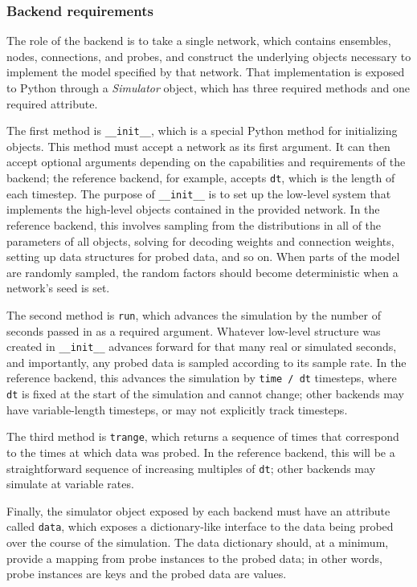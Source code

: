 \documentclass{frontiersSCNS}
\begin{document}
\subsubsection{Backend requirements}
\label{Sec:Backend}

The role of the backend is to take
a single network, which contains
ensembles, nodes, connections, and probes,
and construct the underlying objects necessary
to implement the model specified by that network.
That implementation is exposed to Python
through a \textit{Simulator} object,
which has three required methods
and one required attribute.

The first method is \texttt{\_\_init\_\_},
which is a special Python method for initializing objects.
This method must accept a network as its first argument.
It can then accept optional arguments depending on
the capabilities and requirements of the backend;
the reference backend, for example,
accepts \texttt{dt},
which is the length of each timestep.
The purpose of \texttt{\_\_init\_\_} is to
set up the low-level system
that implements the high-level objects
contained in the provided network.
In the reference backend,
this involves sampling from the distributions
in all of the parameters of all objects,
solving for decoding weights and connection weights,
setting up data structures for probed data,
and so on.
When parts of the model are randomly sampled,
the random factors should become deterministic
when a network's seed is set.

The second method is \texttt{run},
which advances the simulation
by the number of seconds
passed in as a required argument.
Whatever low-level structure was created
in \texttt{\_\_init\_\_} advances forward
for that many real or simulated seconds,
and importantly, any probed data is sampled
according to its sample rate.
In the reference backend,
this advances the simulation
by \texttt{time / dt} timesteps,
where \texttt{dt} is fixed at the start of the simulation
and cannot change;
other backends may have variable-length timesteps,
or may not explicitly track timesteps.

The third method is \texttt{trange},
which returns a sequence of times that correspond
to the times at which data was probed.
In the reference backend, this will be
a straightforward sequence of increasing
multiples of \texttt{dt};
other backends may simulate at variable rates.

Finally, the simulator object exposed by each backend
must have an attribute called \texttt{data},
which exposes a dictionary-like interface
to the data being probed over the course
of the simulation.
The data dictionary should,
at a minimum, provide a mapping from
probe instances to the probed data;
in other words, probe instances are keys
and the probed data are values.
\end{document}
